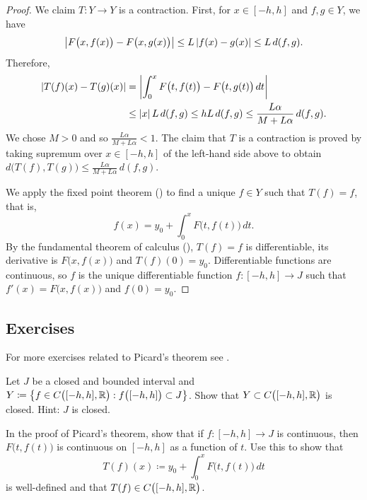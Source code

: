\begin{proof}
We claim $T \colon Y \to Y$ is a contraction.  First, for $x \in [-h,h]$
and $f,g \in Y$, we have
\begin{equation*}
\left\lvert {F\bigl(x,f(x)\bigr) - F\bigl(x,g(x)\bigr)} \right\rvert \leq
L\left\lvert {f(x)- g(x)} \right\rvert \leq L \, d(f,g) .
\end{equation*}
Therefore,
\begin{equation*}
\begin{split}
\left\lvert {T(f)(x) - T(g)(x)} \right\rvert
&= \left\lvert {\int_0^x F\bigl(t,f(t)\bigr) - F\bigl(t,g(t)\bigr)\,dt} \right\rvert \\
& \leq \left\lvert {x} \right\rvert L \, d(f,g)
 \leq h L\, d(f,g)
 \leq \frac{L\alpha}{M+L\alpha} \, d(f,g) .
\end{split}
\end{equation*}
We chose $M > 0$ and so
$\frac{L\alpha}{M+L\alpha} < 1$.  The claim that $T$ is a contraction is proved by
taking supremum over $x \in [-h,h]$ of the left-hand side above to obtain
$d\bigl(T(f),T(g)\bigr) \leq \frac{L\alpha}{M+L\alpha} \, d(f,g)$.

We apply the fixed point theorem ()
to find a unique $f \in Y$ such that $T(f) = f$, that is,
\begin{equation*} %
f(x) = y_0 + \int_0^x F\bigl(t,f(t)\bigr)\,dt .
\end{equation*}
By the fundamental theorem of calculus (),
$T(f) = f$ is differentiable, its derivative is
$F\bigl(x,f(x)\bigr)$ and $T(f)(0) = y_0$.
Differentiable functions are continuous, so
$f$ is the unique differentiable function $f \colon [-h,h] \to J$
such that
 $f'(x) = F\bigl(x,f(x)\bigr)$ and $f(0) = y_0$.
\end{proof}

\subsection{Exercises}

\begin{exnote}
For more exercises related to Picard's theorem see .
\end{exnote}

\begin{exercise}
Let $J$ be a closed and bounded interval and
$Y \coloneqq \bigl\{ f \in C\bigl([-h,h],{\mathbb{R}}\bigr) : f\bigl([-h,h]\bigr) \subset J \bigr\}$.
Show that $Y \subset C\bigl([-h,h],{\mathbb{R}}\bigr)$ is closed.  Hint: $J$ is closed.
\end{exercise}

\begin{exercise}
In the proof of Picard's theorem,
show that if $f \colon [-h,h] \to J$ is continuous, then $F\bigl(t,f(t)\bigr)$
is continuous on $[-h,h]$ as a function of $t$.  Use this to show that
\begin{equation*}
T(f)(x)
\coloneqq
y_0 + \int_0^x F\bigl(t,f(t)\bigr)\,dt
\end{equation*}
is well-defined and that $T(f) \in C\bigl([-h,h],{\mathbb{R}}\bigr)$.
\end{exercise}


